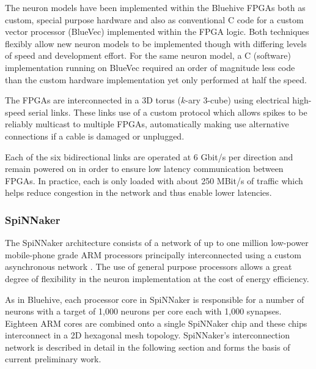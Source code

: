 				The neuron models have been implemented within the Bluehive FPGAs both
				as custom, special purpose hardware and also as conventional C code for
				a custom vector processor (BlueVec) implemented within the FPGA logic.
				Both techniques flexibly allow new neuron models to be implemented
				though with differing levels of speed and development effort. For the
				same neuron model, a C (software) implementation running on BlueVec
				required an order of magnitude less code than the custom hardware
				implementation yet only performed at half the speed.
				
				The FPGAs are interconnected in a 3D torus ($k$-ary 3-cube) using
				electrical high-speed serial links. These links use of a custom protocol
				which allows spikes to be reliably multicast to multiple FPGAs,
				automatically making use alternative connections if a cable is damaged
				or unplugged.
				
				Each of the six bidirectional links are operated at 6 Gbit/s per
				direction and remain powered on in order to ensure low latency
				communication between FPGAs. In practice, each is only loaded with about
				250 MBit/s of traffic which helps reduce congestion in the network and
				thus enable lower latencies.
				
			
			\subsubsection{SpiNNaker}
				
				
				The SpiNNaker architecture consists of a network of up to one million
				low-power mobile-phone grade ARM processors principally interconnected
				using a custom asynchronous network \cite{furber06}. The use of general
				purpose processors allows a great degree of flexibility in the neuron
				implementation at the cost of energy efficiency.
				
				As in Bluehive, each processor core in SpiNNaker is responsible for a
				number of neurons with a target of 1,000 neurons per core each with
				1,000 synapses. Eighteen ARM cores are combined onto a single SpiNNaker
				chip and these chips interconnect in a 2D hexagonal mesh topology.
				SpiNNaker's interconnection network is described in detail in the
				following section and forms the basis of current preliminary work.
	
